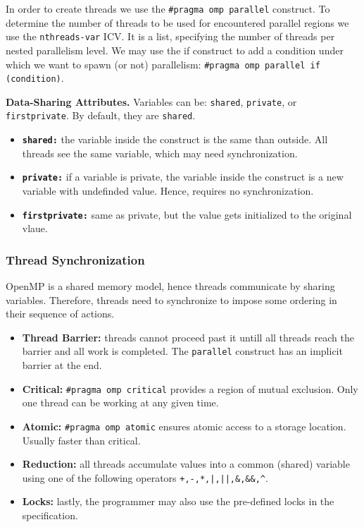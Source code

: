 In order to create threads we use the \texttt{\#pragma omp parallel} construct.
To determine the number of threads to be used for encountered parallel regions we use the \texttt{nthreads-var} ICV.
It is a list, specifying the number of threads per nested parallelism level.
We may use the if construct to add a condition under which we want to spawn (or not) parallelism: \texttt{\#pragma omp parallel if (condition)}.

\textbf{Data-Sharing Attributes.}
Variables can be: \texttt{shared}, \texttt{private}, or \texttt{firstprivate}.
By default, they are \texttt{shared}.
\begin{itemize}
    \item \textbf{\texttt{shared:}} the variable inside the construct is the same than outside. All threads see the same variable, which may need synchronization.
    \item \textbf{\texttt{private:}} if a variable is private, the variable inside the construct is a new variable with undefinded value. Hence, requires no synchronization.
    \item \textbf{\texttt{firstprivate:}} same as private, but the value gets initialized to the original vlaue.
\end{itemize}

\subsubsection{Thread Synchronization}

OpenMP is a shared memory model, hence threads communicate by sharing variables.
Therefore, threads need to synchronize to impose some ordering in their sequence of actions.
\begin{itemize}
    \item \textbf{Thread Barrier:} threads cannot proceed past it untill all threads reach the barrier and all work is completed. The \texttt{parallel} construct has an implicit barrier at the end.
    \item \textbf{Critical:} \texttt{\#pragma omp critical} provides a region of mutual exclusion. Only one thread can be working at any given time.
    \item \textbf{Atomic:} \texttt{\#pragma omp atomic} ensures atomic access to a storage location. Usually faster than critical.
    \item \textbf{Reduction:} all threads accumulate values into a common (shared) variable using one of the following operators \texttt{+,-,*,|,||,\&,\&\&,\^}.
    \item \textbf{Locks:} lastly, the programmer may also use the pre-defined locks in the specification.
\end{itemize}

